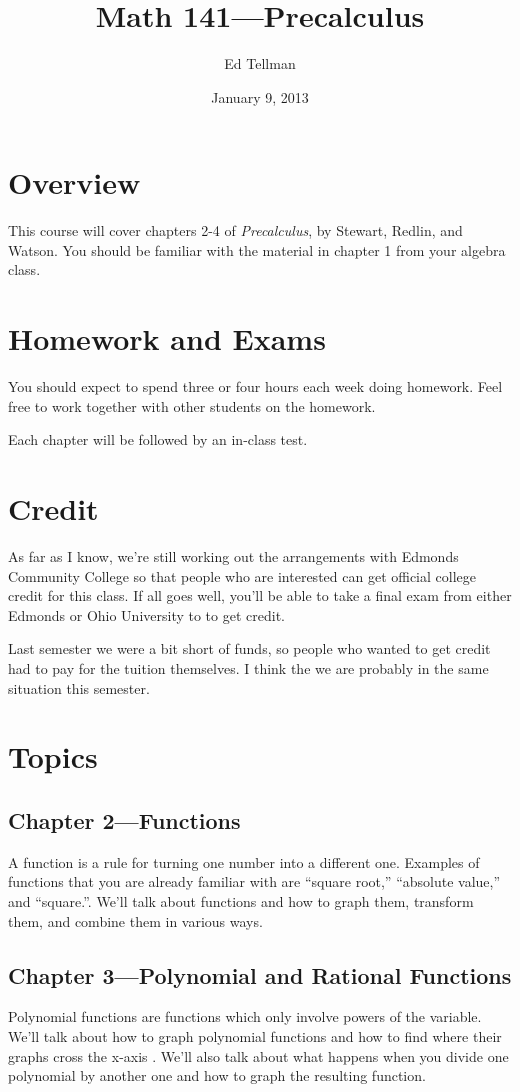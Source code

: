 \documentclass[fleqn, onecolumn]{article}
\author{Ed Tellman}
\title{Math 141---Precalculus}
\date{January 9, 2013}
\begin{document}
\maketitle

\section{Overview}
This course will cover chapters 2-4 of {\em Precalculus}, by Stewart, Redlin, and Watson.  You should be familiar with
the material in chapter 1 from your algebra class.

\section{Homework and Exams}

You should expect to spend three or four hours each week doing homework.  Feel free to work together with other students
on the homework.

Each chapter will be followed by an in-class test.  

\section{Credit}
As far as I know, we're still working out the arrangements with Edmonds Community College so that people who are
interested can get official college credit for this class.  If all goes well, you'll be able to take a final exam from
either Edmonds or Ohio University to to get credit.  

Last semester we were a bit short of funds, so people who wanted to get credit had to pay for the tuition themselves.  I
think the we are probably in the same situation this semester.

\section{Topics}

\subsection{Chapter 2---Functions}
A function is a rule for turning one number into a different one.  Examples of functions that you are already 
familiar with are ``square root,'' ``absolute value,'' and ``square.''.  We'll talk about functions and how 
to graph them, transform them, and combine them in various ways.

\subsection{Chapter 3---Polynomial and Rational Functions}
Polynomial functions are functions which only involve powers of the variable.  We'll talk about how to graph polynomial
functions and how to find where their graphs cross the x-axis .  We'll also talk about what happens when you divide one
polynomial by another one and how to graph the resulting function.
\end{document}
